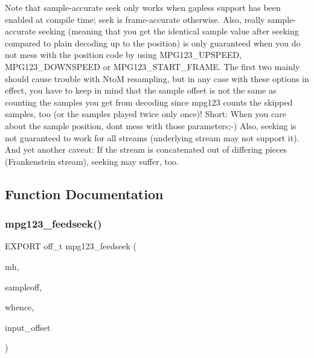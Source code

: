 Note that sample-\/accurate seek only works when gapless support has been enabled at compile time; seek is frame-\/accurate otherwise. Also, really sample-\/accurate seeking (meaning that you get the identical sample value after seeking compared to plain decoding up to the position) is only guaranteed when you do not mess with the position code by using M\+P\+G123\+\_\+\+U\+P\+S\+P\+E\+ED, M\+P\+G123\+\_\+\+D\+O\+W\+N\+S\+P\+E\+ED or M\+P\+G123\+\_\+\+S\+T\+A\+R\+T\+\_\+\+F\+R\+A\+ME. The first two mainly should cause trouble with NtoM resampling, but in any case with these options in effect, you have to keep in mind that the sample offset is not the same as counting the samples you get from decoding since mpg123 counts the skipped samples, too (or the samples played twice only once)! Short\+: When you care about the sample position, don\textquotesingle{}t mess with those parameters;-\/) Also, seeking is not guaranteed to work for all streams (underlying stream may not support it). And yet another caveat\+: If the stream is concatenated out of differing pieces (Frankenstein stream), seeking may suffer, too. 

\subsection{Function Documentation}
\mbox{\label{group__mpg123__seek_ga558dd104b09d39624ea73f9cb1d47cbc}} 
\subsubsection{\texorpdfstring{mpg123\+\_\+feedseek()}{mpg123\_feedseek()}}
{\footnotesize\ttfamily E\+X\+P\+O\+RT off\+\_\+t mpg123\+\_\+feedseek (\begin{DoxyParamCaption}\item[{\hyperlink{group__mpg123__init_ga6728e2839a395f3a07d4514da659faca}{mpg123\+\_\+handle} $\ast$}]{mh,  }\item[{off\+\_\+t}]{sampleoff,  }\item[{int}]{whence,  }\item[{off\+\_\+t $\ast$}]{input\+\_\+offset }\end{DoxyParamCaption})}

